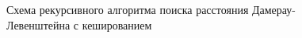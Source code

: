 \begin{figure}[H!]
	
		
		\caption{Схема рекурсивного алгоритма поиска расстояния Дамерау-Левенштейна с кешированием}
		
		\label{fig:dleven_rec_cash1}
		
	\end{figure}



